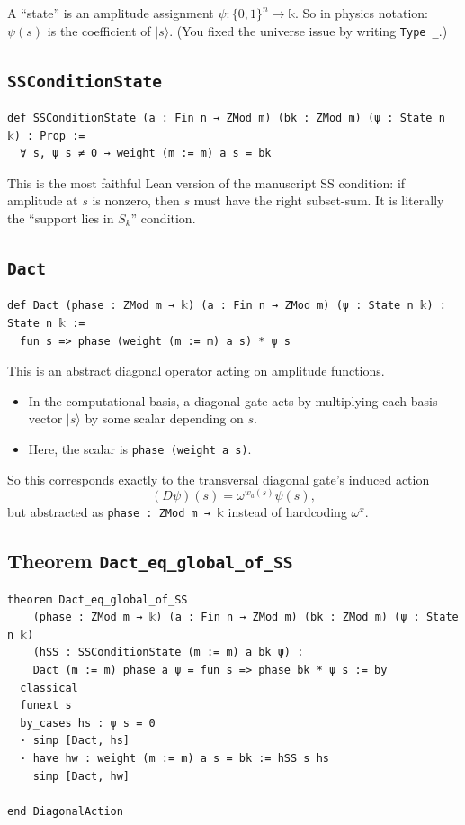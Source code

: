 \documentclass[11pt]{article}
\newcommand{\ket}[1]{\lvert #1 \rangle}
\begin{document}
A ``state'' is an amplitude assignment $\psi:\{0,1\}^n\to\mathbb{k}$.
So in physics notation: $\psi(s)$ is the coefficient of $\ket{s}$.
(You fixed the universe issue by writing \texttt{Type \_}.)

\subsection*{\texttt{SSConditionState}}

\begin{lstlisting}
def SSConditionState (a : Fin n → ZMod m) (bk : ZMod m) (ψ : State n 𝕜) : Prop :=
  ∀ s, ψ s ≠ 0 → weight (m := m) a s = bk
\end{lstlisting}

This is the most faithful Lean version of the manuscript SS condition:
if amplitude at $s$ is nonzero, then $s$ must have the right subset-sum.
It is literally the ``support lies in $S_k$'' condition.
\subsection*{\texttt{Dact}}

\begin{lstlisting}
def Dact (phase : ZMod m → 𝕜) (a : Fin n → ZMod m) (ψ : State n 𝕜) : State n 𝕜 :=
  fun s => phase (weight (m := m) a s) * ψ s
\end{lstlisting}

This is an abstract diagonal operator acting on amplitude functions.

\begin{itemize}
\item In the computational basis, a diagonal gate acts by multiplying each basis vector $\ket{s}$ by some scalar depending on $s$.
\item Here, the scalar is \texttt{phase (weight a s)}.
\end{itemize}

So this corresponds exactly to the transversal diagonal gate's induced action
\[
(D\psi)(s)=\omega^{w_a(s)} \psi(s),
\]
but abstracted as \texttt{phase : ZMod m → 𝕜} instead of hardcoding $\omega^x$.

\subsection*{Theorem \texttt{Dact\_eq\_global\_of\_SS}}

\begin{lstlisting}
theorem Dact_eq_global_of_SS
    (phase : ZMod m → 𝕜) (a : Fin n → ZMod m) (bk : ZMod m) (ψ : State n 𝕜)
    (hSS : SSConditionState (m := m) a bk ψ) :
    Dact (m := m) phase a ψ = fun s => phase bk * ψ s := by
  classical
  funext s
  by_cases hs : ψ s = 0
  · simp [Dact, hs]
  · have hw : weight (m := m) a s = bk := hSS s hs
    simp [Dact, hw]

end DiagonalAction
\end{lstlisting}
\end{document}
